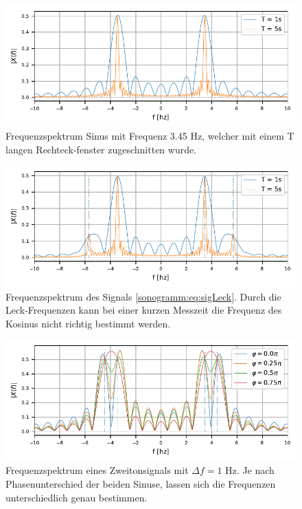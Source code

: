\begin{figure}
    \centering
    \includegraphics{papers/sonogramm/images/RectWinHarmEx.pdf}
    \caption{Frequenzspektrum Sinus mit Frequenz 3.45 Hz, welcher mit einem T langen 
    Rechteck-fenster zugeschnitten wurde.
    \label{sonogramm:leakageDemo}
    }
\end{figure}

\begin{figure}
    \centering
    \includegraphics{papers/sonogramm/images/twohamrrect.pdf}
    \caption{Frequenzspektrum des Signals \eqref{sonogramm:eq:sigLeck}.
    Durch die Leck-Frequenzen kann bei einer kurzen Messzeit die Frequenz des Kosinus 
    nicht richtig bestimmt werden.
    \label{sonogramm:leakageDemo2}
    }
\end{figure}

\begin{figure}
    \centering
    \includegraphics{papers/sonogramm/images/twoharmphasediff.pdf}
    \caption{Frequenzspektrum eines Zweitonsignals mit $\Delta f = 1$ Hz.
    Je nach Phasenunterschied der beiden Sinuse, lassen sich die Frequenzen unterschiedlich
    genau bestimmen.
    \label{sonogramm:freqdiffdemo}
    }
\end{figure}

